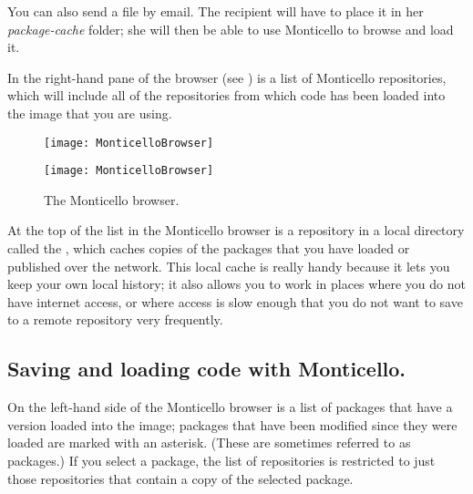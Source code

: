 \documentclass[a4paper,10pt,twoside]{book}
\begin{document}
{You can also send a  file by email. 
The recipient will have to place it in her \emph{package-cache} folder; she will then be able to use Monticello to browse and load it. 

In the right-hand pane of the browser (see ) is a list of Monticello repositories, which will include all of the repositories from which code has been loaded into the image that you are using.  

\begin{figure}[hbt]
\ifluluelse
	{\centerline {\texttt{[image: MonticelloBrowser]}}}
	{\centerline {\texttt{[image: MonticelloBrowser]}}}
\caption{The Monticello browser.
}
\end{figure}

At the top of the list in the Monticello browser is a repository in a local directory called the , which caches copies of the packages that you have loaded or published over the network. This local cache is really handy because it lets you keep your own local history; it also allows you to work in places where you do not have internet access, or where access is slow enough that you do not want to save to a remote repository very frequently.


\subsection{Saving and loading code with Monticello.}
On the left-hand side of the Monticello browser is a list of packages that have a version loaded into the image; packages that have been modified since they were loaded are marked with an asterisk.  (These are sometimes referred to as  packages.)  If you select a package, the list of repositories is restricted to just those repositories that contain a copy of the selected package.


}
\end{document}
